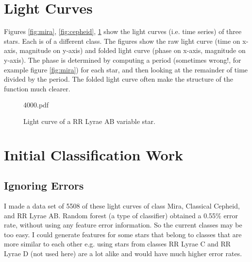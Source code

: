 \documentclass[11pt]{article}
\begin{document}
\section{Light Curves}

Figures \ref{fig:mira}, \ref{fig:cepheid}, \ref{fig:rrlyrae} show the light curves (i.e. time series) of three stars. Each is of a different class. The figures show the raw light curve (time on x-axis, magnitude on y-axis) and folded light curve (phase on x-axis, magnitude on y-axis). The phase is determined by computing a period (sometimes wrong!, for example figure \ref{fig:mira}) for each star, and then looking at the remainder of time divided by the period. The folded light curve often make the structure of the function much clearer.





\begin{figure}[h]
  \begin{center}
    \begin{includegraphics}[scale=.5]{4000.pdf}
      \caption{Light curve of a RR Lyrae AB variable star.\label{fig:rrlyrae}}
    \end{includegraphics}
  \end{center}
\end{figure}



\section{Initial Classification Work}

\subsection{Ignoring Errors}
I made a data set of 5508 of these light curves of class Mira, Classical Cepheid, and RR Lyrae AB. Random forest (a type of classifier) obtained a 0.55\% error rate, without using any feature error information. So the current classes may be too easy. I could generate features for some stars that belong to classes that are more similar to each other e.g. using stars from classes RR Lyrae C and RR Lyrae D (not used here) are a lot alike and would have much higher error rates.
\end{document}
